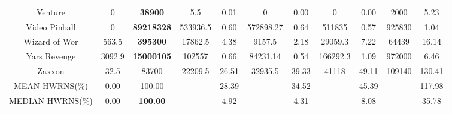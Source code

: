\documentclass[nohyperref]{article}
\def\GDIImeanHWRNS{117.98}
\def\GDIImedianHWRNS{35.78}
\def\rainbowmeanHWRNS{28.39}
\def\rainbowmedianHWRNS{4.92}
\def\impalameanHWRNS{34.52}
\def\impalamedianHWRNS{4.31}
\def\lasermeanHWRNS{45.39}
\def\lasermedianHWRNS{8.08}
\theoremstyle{plain}
\begin{document}
\begin{table}[!hb]
\begin{center}
\begin{tabular}{|c| c| c| c c| c c| c c| c c| }
 Venture            & 0         & \textbf{38900}     & 5.5      &0.01    & 0          & 0.00       & 0       & 0.00      &2000              &5.23           \\
 Video Pinball      & 0         & \textbf{89218328}  & 533936.5 &0.60    & 572898.27  & 0.64       & 511835  & 0.57      &925830            &1.04          \\
 Wizard of Wor      & 563.5     & \textbf{395300}    & 17862.5  &4.38    & 9157.5     & 2.18       & 29059.3 & 7.22      &64439             &16.14         \\
 Yars Revenge       & 3092.9    & \textbf{15000105}  & 102557   &0.66    & 84231.14   & 0.54       & 166292.3& 1.09      &972000            &6.46           \\
 Zaxxon             & 32.5      & 83700     & 22209.5  &26.51   & 32935.5    & 39.33      & 41118   & 49.11     &109140              &130.41  \\
\hline
MEAN HWRNS(\%)      & 0.00      & 100.00    &          & \rainbowmeanHWRNS  &            & \impalameanHWRNS  &        & \lasermeanHWRNS &      & \GDIImeanHWRNS   \\
\hline   
MEDIAN HWRNS(\%)    & 0.00      & \textbf{100.00}    &          & \rainbowmedianHWRNS   &            & \impalamedianHWRNS &        & \lasermedianHWRNS &      &  \GDIImedianHWRNS  \\
\hline
\end{tabular}
\end{center}
\end{table}
\clearpage
\end{document}
